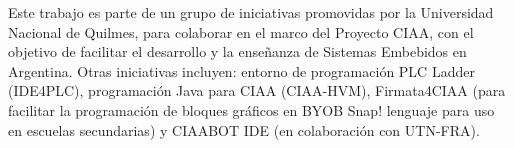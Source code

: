 Este trabajo es parte de un grupo de iniciativas promovidas por la Universidad Nacional de Quilmes, para colaborar en el marco del Proyecto CIAA, con el objetivo de facilitar el desarrollo y la enseñanza de Sistemas Embebidos en Argentina. Otras iniciativas incluyen: entorno de programación PLC Ladder (IDE4PLC), programación Java para CIAA (CIAA-HVM), Firmata4CIAA (para facilitar la programación de bloques gráficos en BYOB Snap! lenguaje para uso en escuelas secundarias) y CIAABOT IDE (en colaboración con UTN-FRA).
